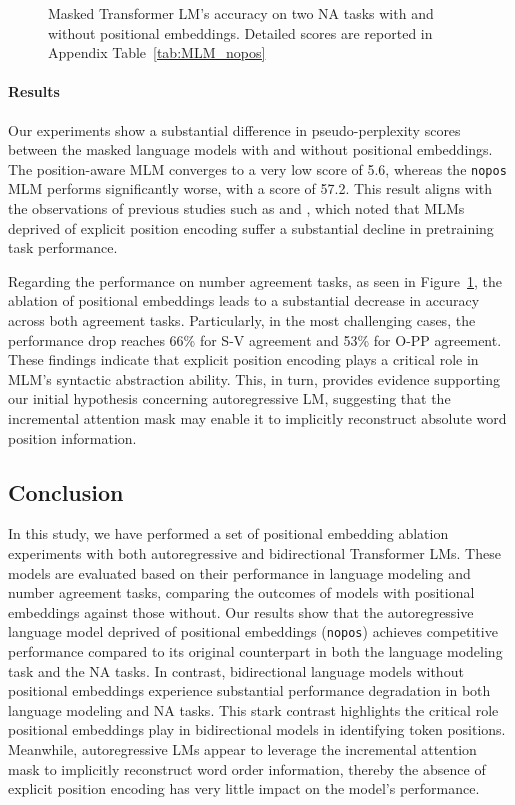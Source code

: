 \begin{figure}[ht]
\begin{subfigure}[b]{0.49\textwidth}
    \end{subfigure}
    \caption{Masked Transformer LM's accuracy on two NA tasks with and without positional embeddings. Detailed scores are reported in Appendix Table~\ref{tab:MLM_nopos} \label{fig:mlm_nopos_NA_tasks}}
\end{figure}

\paragraph{Results}
Our experiments show a substantial difference in pseudo-perplexity scores between the masked language models with and without positional embeddings. The position-aware MLM converges to a very low score of 5.6, whereas the \texttt{nopos} MLM performs significantly worse, with a score of 57.2. This result aligns with the observations of previous studies such as \cite{sinha-etal-2021-masked} and \cite{haviv-etal-2022-transformer}, which noted that MLMs deprived of explicit position encoding suffer a substantial decline in pretraining task performance.

Regarding the performance on number agreement tasks, as seen in Figure~\ref{fig:mlm_nopos_NA_tasks}, the ablation of positional embeddings leads to a substantial decrease in accuracy across both agreement tasks. Particularly, in the most challenging cases, the performance drop reaches 66\% for S-V agreement and 53\% for O-PP agreement. These findings indicate that explicit position encoding plays a critical role in MLM's syntactic abstraction ability. This, in turn, provides evidence supporting our initial hypothesis concerning autoregressive LM, suggesting that the incremental attention mask may enable it to implicitly reconstruct absolute word position information.



\subsection{Conclusion}
In this study, we have performed a set of positional embedding ablation experiments with both autoregressive and bidirectional Transformer LMs. These models are evaluated based on their performance in language modeling and number agreement tasks, comparing the outcomes of models with positional embeddings against those without. Our results show that the autoregressive language model deprived of positional embeddings (\texttt{nopos}) achieves competitive performance compared to its original counterpart in both the language modeling task and the NA tasks. In contrast, bidirectional language models without positional embeddings experience substantial performance degradation in both language modeling and NA tasks. This stark contrast highlights the critical role positional embeddings play in bidirectional models in identifying token positions. Meanwhile, autoregressive LMs appear to leverage the incremental attention mask to implicitly reconstruct word order information, thereby the absence of explicit position encoding has very little impact on the model's performance.

